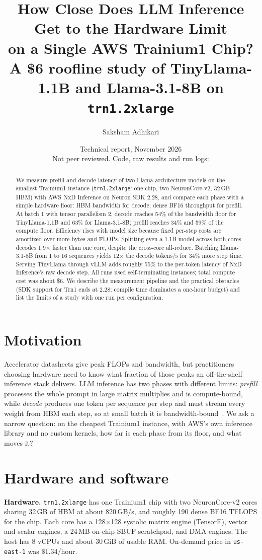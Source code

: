 \documentclass[11pt]{article}
\title{How Close Does LLM Inference Get to the Hardware Limit\\on a Single AWS Trainium1 Chip?\\[0.4em]
\large A \$6 roofline study of TinyLlama-1.1B and Llama-3.1-8B on \texttt{trn1.2xlarge}}
\author{Saksham Adhikari}
\date{Technical report, November 2026 \\ \small Not peer reviewed. Code, raw results and run logs: \repo}
\begin{document}
\maketitle

\begin{abstract}
We measure prefill and decode latency of two Llama-architecture models on the smallest Trainium1 instance
(\texttt{trn1.2xlarge}: one chip, two NeuronCore-v2, 32\,GB HBM) with AWS NxD Inference on Neuron SDK 2.28,
and compare each phase with a simple hardware floor: HBM bandwidth for decode, dense BF16 throughput for prefill.
At batch 1 with tensor parallelism 2, decode reaches 54\% of the bandwidth floor for TinyLlama-1.1B and 63\% for
Llama-3.1-8B; prefill reaches 34\% and 59\% of the compute floor. Efficiency rises with model size because fixed per-step
costs are amortized over more bytes and FLOPs. Splitting even a 1.1B model across both cores decodes 1.9$\times$ faster than
one core, despite the cross-core all-reduce. Batching Llama-3.1-8B from 1 to 16 sequences yields 12$\times$ the decode tokens/s
for 34\% more step time. Serving TinyLlama through vLLM adds roughly 55\% to the per-token latency of NxD Inference's raw decode
step. All runs used self-terminating instances; total compute cost was about \$6. We describe the measurement pipeline and the
practical obstacles (SDK support for Trn1 ends at 2.28; compile time dominates a one-hour budget) and list the limits of a study
with one run per configuration.
\end{abstract}

\section{Motivation}
Accelerator datasheets give peak FLOPs and bandwidth, but practitioners choosing hardware need to know what fraction of those
peaks an off-the-shelf inference stack delivers. LLM inference has two phases with different limits: \emph{prefill} processes the
whole prompt in large matrix multiplies and is compute-bound, while \emph{decode} produces one token per sequence per step and must
stream every weight from HBM each step, so at small batch it is bandwidth-bound~\cite{williams2009roofline,pope2023efficiently}.
We ask a narrow question: on the cheapest Trainium1 instance, with AWS's own inference library and no custom kernels, how far is
each phase from its floor, and what moves it?

\section{Hardware and software}
\textbf{Hardware.} \texttt{trn1.2xlarge} has one Trainium1 chip with two NeuronCore-v2 cores sharing 32\,GB of HBM at about
820\,GB/s, and roughly 190 dense BF16 TFLOPS for the chip. Each core has a 128$\times$128 systolic matrix engine (TensorE), vector
and scalar engines, a 24\,MB on-chip SBUF scratchpad, and DMA engines. The host has 8 vCPUs and about 30\,GiB of usable RAM.
On-demand price in \texttt{us-east-1} was \$1.34/hour.
\end{document}
